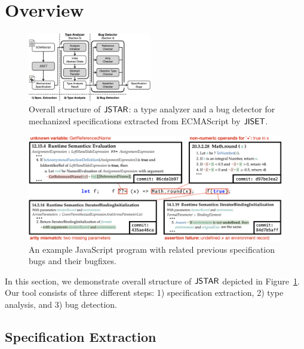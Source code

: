 \section{Overview}\label{sec:overview}

\begin{figure}
  \centering
  \includegraphics[width=0.48\textwidth]{img/overall}
  \vspace*{-1.5em}
  \caption{Overall structure of $\textsf{JSTAR}$: a type analyzer and a bug detector for
  mechanized specifications extracted from ECMAScript by $\textsf{JISET}$.}
  \label{fig:overall}
  \vspace*{-1.5em}
\end{figure}

\begin{figure}[t]
  \centering
  \includegraphics[width=\textwidth]{img/example}
  \vspace*{-2em}
  \caption{An example JavaScript program with related previous specification
  bugs and their bugfixes.}
  \label{fig:example}
  \vspace*{-1.5em}
\end{figure}

In this section, we demonstrate overall structure of $\textsf{JSTAR}$ depicted in
Figure~\ref{fig:overall}.  Our tool consists of three different steps:
1) specification extraction, 2) type analysis, and 3) bug detection.


\subsection{Specification Extraction}\label{sec:overview-spec-extract}

